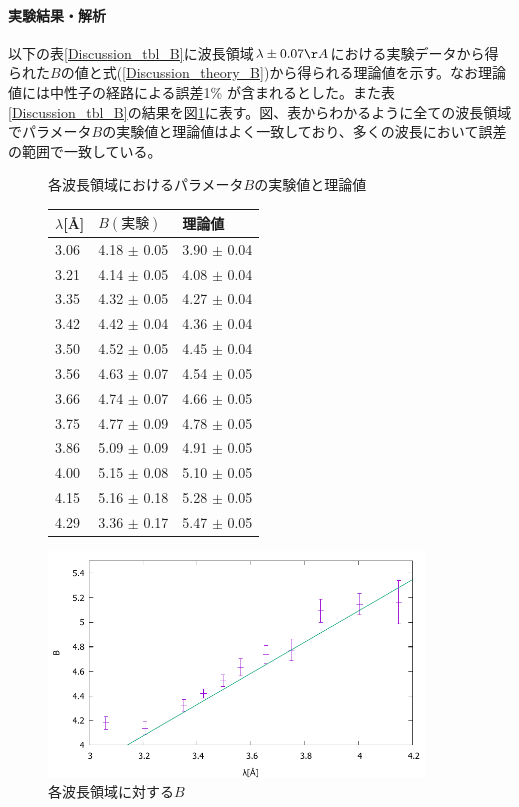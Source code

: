 \paragraph{実験結果・解析}
以下の表\ref{Discussion_tbl_B}に波長領域$\lambda \pm 0.07 \AA$における実験データから得られた$B$の値と式(\ref{Discussion_theory_B})から得られる理論値を示す。なお理論値には中性子の経路による誤差1\% が含まれるとした。また表\ref{Discussion_tbl_B}の結果を図\ref{Discussion_fig_B}に表す。図、表からわかるように全ての波長領域でパラメータ$B$の実験値と理論値はよく一致しており、多くの波長において誤差の範囲で一致している。

\begin{figure}[h]
\begin{minipage}{0.35\hsize}
\centering
\makeatletter
\def\@captype{table}
\makeatother
\caption{各波長領域におけるパラメータ$B$の実験値と理論値} \label{Discussion_tbl_B}
\begin{tabular}{lll}
$\lambda$[\AA] &  $B(実験)$ &   理論値 \\ \hline
3.06  & 4.18  $\pm$ 0.05  & 3.90  $\pm$ 0.04  \\
3.21  & 4.14  $\pm$ 0.05  & 4.08  $\pm$ 0.04  \\
3.35  & 4.32  $\pm$ 0.05  & 4.27  $\pm$ 0.04  \\
3.42  & 4.42  $\pm$ 0.04  & 4.36  $\pm$ 0.04  \\
3.50  & 4.52  $\pm$ 0.05  & 4.45  $\pm$ 0.04  \\
3.56  & 4.63  $\pm$ 0.07  & 4.54  $\pm$ 0.05  \\
3.66  & 4.74  $\pm$ 0.07  & 4.66  $\pm$ 0.05  \\
3.75  & 4.77  $\pm$ 0.09  & 4.78  $\pm$ 0.05  \\
3.86  & 5.09  $\pm$ 0.09  & 4.91  $\pm$ 0.05  \\
4.00  & 5.15  $\pm$ 0.08  & 5.10  $\pm$ 0.05  \\
4.15  & 5.16  $\pm$ 0.18  & 5.28  $\pm$ 0.05  \\
4.29  & 3.36  $\pm$ 0.17  & 5.47  $\pm$ 0.05  \\ \hline
\end{tabular}
\end{minipage}
\begin{minipage}{0.65\hsize}
\centering
\vspace{2.5cm}
\includegraphics[width=10cm]{discussion/B/B_F.pdf}
\caption{各波長領域に対する$B$} \label{Discussion_fig_B}
\end{minipage}
\end{figure}

